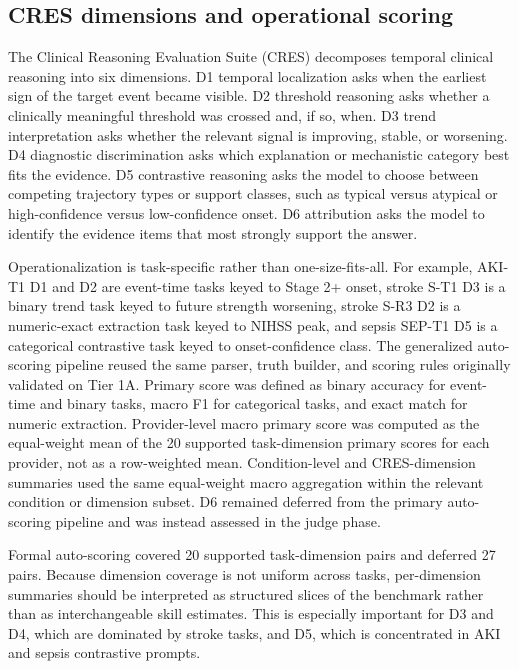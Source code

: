 \documentclass[pdflatex,sn-nature]{sn-jnl}
\begin{document}
\subsection{CRES dimensions and operational scoring}

The Clinical Reasoning Evaluation Suite (CRES) decomposes temporal clinical reasoning into six dimensions. D1 temporal localization asks when the earliest sign of the target event became visible. D2 threshold reasoning asks whether a clinically meaningful threshold was crossed and, if so, when. D3 trend interpretation asks whether the relevant signal is improving, stable, or worsening. D4 diagnostic discrimination asks which explanation or mechanistic category best fits the evidence. D5 contrastive reasoning asks the model to choose between competing trajectory types or support classes, such as typical versus atypical or high-confidence versus low-confidence onset. D6 attribution asks the model to identify the evidence items that most strongly support the answer.

Operationalization is task-specific rather than one-size-fits-all. For example, AKI-T1 D1 and D2 are event-time tasks keyed to Stage 2+ onset, stroke S-T1 D3 is a binary trend task keyed to future strength worsening, stroke S-R3 D2 is a numeric-exact extraction task keyed to NIHSS peak, and sepsis SEP-T1 D5 is a categorical contrastive task keyed to onset-confidence class. The generalized auto-scoring pipeline reused the same parser, truth builder, and scoring rules originally validated on Tier 1A. Primary score was defined as binary accuracy for event-time and binary tasks, macro F1 for categorical tasks, and exact match for numeric extraction. Provider-level macro primary score was computed as the equal-weight mean of the 20 supported task-dimension primary scores for each provider, not as a row-weighted mean. Condition-level and CRES-dimension summaries used the same equal-weight macro aggregation within the relevant condition or dimension subset. D6 remained deferred from the primary auto-scoring pipeline and was instead assessed in the judge phase.

Formal auto-scoring covered 20 supported task-dimension pairs and deferred 27 pairs. Because dimension coverage is not uniform across tasks, per-dimension summaries should be interpreted as structured slices of the benchmark rather than as interchangeable skill estimates. This is especially important for D3 and D4, which are dominated by stroke tasks, and D5, which is concentrated in AKI and sepsis contrastive prompts.
\end{document}
